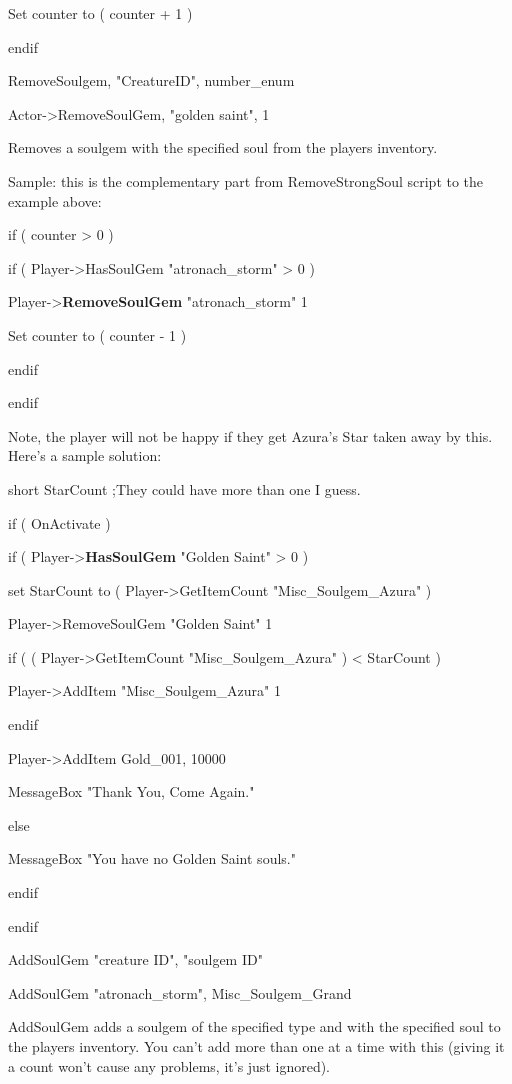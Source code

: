 \documentclass[
]{article}
\begin{document}
Set counter to ( counter + 1 )

endif

RemoveSoulgem, "CreatureID", number\_enum

Actor-\textgreater RemoveSoulGem, "golden saint", 1

Removes a soulgem with the specified soul from the players inventory.

Sample: this is the complementary part from RemoveStrongSoul script to
the example above:

if ( counter \textgreater{} 0 )

if ( Player-\textgreater HasSoulGem "atronach\_storm" \textgreater{} 0 )

Player-\textgreater{}\textbf{RemoveSoulGem} "atronach\_storm" 1

Set counter to ( counter - 1 )

endif

endif

Note, the player will not be happy if they get Azura's Star taken away
by this. Here's a sample solution:

short StarCount ;They could have more than one I guess.

if ( OnActivate )

if ( Player-\textgreater{}\textbf{HasSoulGem} "Golden Saint"
\textgreater{} 0 )

set StarCount to ( Player-\textgreater GetItemCount
"Misc\_Soulgem\_Azura" )

Player-\textgreater RemoveSoulGem "Golden Saint" 1

if ( ( Player-\textgreater GetItemCount "Misc\_Soulgem\_Azura" )
\textless{} StarCount )

Player-\textgreater AddItem "Misc\_Soulgem\_Azura" 1

endif

Player-\textgreater AddItem Gold\_001, 10000

MessageBox "Thank You, Come Again."

else

MessageBox "You have no Golden Saint souls."

endif

endif

AddSoulGem "creature ID", "soulgem ID"

AddSoulGem "atronach\_storm", Misc\_Soulgem\_Grand

AddSoulGem adds a soulgem of the specified type and with the specified
soul to the players inventory. You can't add more than one at a time
with this (giving it a count won't cause any problems, it's just
ignored).
\end{document}
